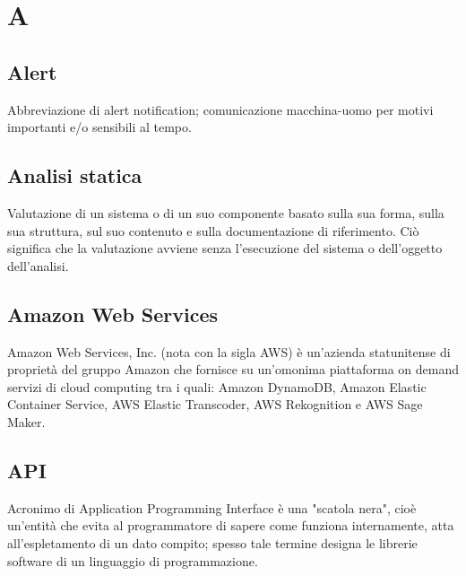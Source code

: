 \section*{A}
\subsection*{Alert}
Abbreviazione di alert notification; comunicazione macchina-uomo per motivi importanti e/o sensibili al tempo.

\subsection*{Analisi statica}
Valutazione di un sistema o di un suo componente basato sulla sua forma, sulla sua struttura, sul suo contenuto e sulla documentazione di riferimento. Ciò significa che la valutazione avviene senza l'esecuzione del sistema o dell'oggetto dell'analisi.

\subsection*{Amazon Web Services}
Amazon Web Services, Inc. (nota con la sigla AWS) è un'azienda statunitense di proprietà del gruppo Amazon che fornisce su un'omonima piattaforma on demand servizi di cloud computing tra i quali: Amazon DynamoDB, Amazon Elastic Container Service, AWS Elastic Transcoder, AWS Rekognition e AWS Sage Maker.

\subsection*{API}
Acronimo di Application Programming Interface è una "scatola nera", cioè un'entità che evita al programmatore di sapere come funziona internamente, atta all'espletamento di un dato compito; spesso tale termine designa le librerie software di un linguaggio di programmazione.



